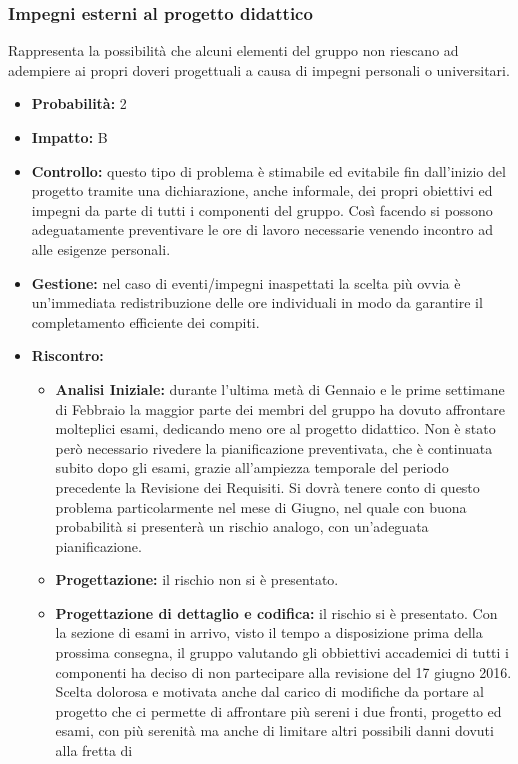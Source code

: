\documentclass[a4paper,11pt]{article}
\begin{document}
		\subsubsection{Impegni esterni al progetto didattico}
		Rappresenta la possibilità che alcuni elementi del gruppo non riescano ad adempiere ai propri doveri progettuali a causa di impegni personali o universitari.
		\begin{itemize}
		\item \textbf{Probabilità:} 2
		\item \textbf{Impatto:} B
		\item \textbf{Controllo:} questo tipo di problema è stimabile ed evitabile fin dall'inizio del progetto tramite una dichiarazione, anche informale, dei propri obiettivi ed impegni da parte di tutti i componenti del gruppo. Così facendo si possono adeguatamente preventivare le ore di lavoro necessarie venendo incontro ad alle esigenze personali.
		\item \textbf{Gestione:} nel caso di eventi/impegni inaspettati la scelta più ovvia è un'immediata redistribuzione delle ore individuali in modo da garantire il completamento efficiente dei compiti.
		\item \textbf{Riscontro:}
			\begin{itemize}
				\item\textbf{Analisi Iniziale:} durante l'ultima metà di Gennaio e le prime settimane di Febbraio la maggior parte dei membri del gruppo ha dovuto affrontare molteplici esami, dedicando meno ore al progetto didattico. Non è stato però necessario rivedere la pianificazione preventivata, che è continuata subito dopo gli esami, grazie all'ampiezza temporale del periodo precedente la Revisione dei Requisiti. Si dovrà tenere conto di questo problema particolarmente nel mese di Giugno, nel quale con buona probabilità si presenterà un rischio analogo, con un'adeguata pianificazione.
				\item\textbf{Progettazione:} il rischio non si è presentato.
				\item\textbf{Progettazione di dettaglio e codifica:} il rischio si è presentato. Con la sezione di esami in arrivo, visto il tempo a disposizione prima della prossima consegna, il gruppo valutando gli obbiettivi accademici di tutti i componenti ha deciso di non partecipare alla revisione del 17 giugno 2016. Scelta dolorosa e motivata anche dal carico di modifiche da portare al progetto che ci permette di affrontare più sereni i due fronti, progetto ed esami, con più serenità ma anche di limitare altri possibili danni dovuti alla fretta di  
			\end{itemize}
		\end{itemize}
\end{document}
